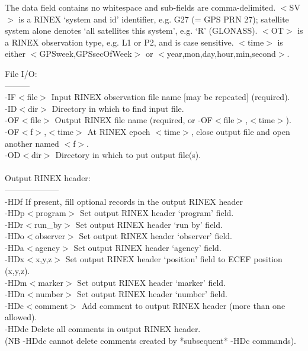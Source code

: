 The data field contains no whitespace and sub-fields are comma-delimited.
 $<$SV$>$ is a RINEX `system and id' identifier, e.g. G27 (= GPS PRN 27);
   satellite system alone denotes `all satellites this system', e.g. `R' (GLONASS).
 $<$OT$>$ is a RINEX observation type, e.g. L1 or P2, and is case sensitive.
 $<$time$>$ is either $<$GPSweek,GPSsecOfWeek$>$ or $<$year,mon,day,hour,min,second$>$.
\\
\begin{\outputsize}
 File I/O:\\
 ---------\\
 -IF$<$file$>$       Input RINEX observation file name [may be repeated] (required). \\
 -ID$<$dir$>$        Directory in which to find input file. \\
 -OF$<$file$>$       Output RINEX file name (required, or -OF$<$file$>$,$<$time$>$). \\
 -OF$<$f$>$,$<$time$>$   At RINEX epoch $<$time$>$, close output file and open another named $<$f$>$. \\
 -OD$<$dir$>$        Directory in which to put output file(s). \\
\\
 Output RINEX header:\\
 --------------------\\
 -HDf            If present, fill optional records in the output RINEX header\\
 -HDp$<$program$>$   Set output RINEX header `program' field.\\
 -HDr$<$run\_by$>$    Set output RINEX header `run by' field.\\
 -HDo$<$observer$>$  Set output RINEX header `observer' field.\\
 -HDa$<$agency$>$    Set output RINEX header `agency' field.\\
 -HDx$<$x,y,z$>$     Set output RINEX header `position' field to ECEF position (x,y,z).\\
 -HDm$<$marker$>$    Set output RINEX header `marker' field.\\
 -HDn$<$number$>$    Set output RINEX header `number' field.\\
 -HDc$<$comment$>$   Add comment to output RINEX header (more than one allowed).\\
 -HDdc           Delete all comments in output RINEX header.\\
           (NB -HDdc cannot delete comments created by *subsequent* -HDc commands).\\

\end{\outputsize}
